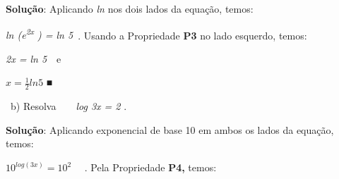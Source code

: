 \documentclass[12pt]{article}
\begin{document}
\begin{enumerate}[label*={\fontsize{14pt}{14pt}\selectfont \textbf{\arabic*.}}]
\begin{adjustwidth}{0.3in}{0.0in}
\end{adjustwidth}


\vspace{\baselineskip}
\begin{adjustwidth}{0.3in}{0.0in}
\textbf{Solução}: Aplicando \textit{ln} nos dois lados da equação, temos:\par

\end{adjustwidth}


\vspace{\baselineskip}
\begin{adjustwidth}{0.3in}{0.0in}
\textit{ln (e\textsuperscript{2x} ) = ln 5}\  . Usando a Propriedade \textbf{P3} no lado esquerdo, temos:\par

\end{adjustwidth}


\vspace{\baselineskip}
\begin{adjustwidth}{0.3in}{0.0in}
\textit{2x = ln 5}\ \  e\par

\end{adjustwidth}


\vspace{\baselineskip}
\begin{adjustwidth}{0.3in}{0.0in}
 \( x=\frac{1}{2}ln5 \) ■\par

\end{adjustwidth}

\begin{adjustwidth}{0.3in}{0.0in}
\begin{justify}
\  b) Resolva\ \ \ \  \textit{log 3x = 2} . 
\end{justify}\par

\end{adjustwidth}


\vspace{\baselineskip}
\textbf{Solução}: Aplicando exponencial de base 10 em ambos os lados da equação, temos:\par

\begin{adjustwidth}{0.3in}{0.0in}
\begin{justify}
 \( 10^{log⁡ \left( 3x \right) }=10^{2} \) \ \  . Pela Propriedade \textbf{P4,} temos:
\end{justify}\par


\end{adjustwidth}
\end{enumerate}
\end{document}
